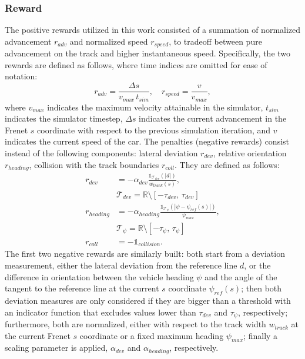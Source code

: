 \documentclass[letterpaper, conference]{IEEEtran}
\begin{document}
\subsubsection{Reward}
The positive rewards utilized in this work consisted of a summation of normalized advancement $r_{adv}$ and normalized speed $r_{speed}$, to tradeoff between pure advancement on the track and higher instantaneous speed. Specifically, the two rewards are defined as follows, where time indices are omitted for ease of notation:
\begin{equation}
    r_{adv} = \frac{\Delta s}{v_{max}\,t_{sim}}, \quad r_{speed} = \frac{v}{v_{max}}, 
\end{equation}
where $v_{max}$ indicates the maximum velocity attainable in the simulator, $t_{sim}$ indicates the simulator timestep, $\Delta s$ indicates the current advancement in the Frenet $s$ coordinate with respect to the previous simulation iteration, and $v$ indicates the current speed of the car.
The penalties (negative rewards) consist instead of the following components: lateral deviation $r_{dev}$, relative orientation $r_{heading}$, collision with the track boundaries $r_{coll}$. They are defined as follows:
\begin{align}
    r_{dev} &= -\alpha_{dev} \frac{\mathbb{1}_{\mathcal{T}_{dev}}(|d|)}{w_{track}(s)},\\
    &\mathcal{T}_{dev} = \mathbb{R} \setminus \left[-\tau_{dev},\,\tau_{dev}\right] \nonumber \\
    r_{heading} &= -\alpha_{heading} \frac{\mathbb{1}_{\mathcal{T}_{\psi}}(|\psi-\psi_{ref}(s)|)}{\psi_{max}},\\
    &\mathcal{T}_{\psi} = \mathbb{R} \setminus \left[-\tau_{\psi},\,\tau_{\psi}\right] \nonumber \\ 
    r_{coll} &= -\mathbb{1}_{collision}.
\end{align}
The first two negative rewards are similarly built: both start from a deviation measurement, either the lateral deviation from the reference line $d$, or the difference in orientation between the vehicle heading $\psi$ and the angle of the tangent to the reference line at the current $s$ coordinate $\psi_{ref}(s)$; then both deviation measures are only considered if they are bigger than a threshold with an indicator function that excludes values lower than $\tau_{dev}$ and $\tau_{\psi}$, respectively; furthermore, both are normalized, either with respect to the track width $w_{track}$ at the current Frenet $s$ coordinate or a fixed maximum heading $\psi_{max}$; finally a scaling parameter is applied, $\alpha_{dev}$ and $\alpha_{heading}$, respectively.
\end{document}
